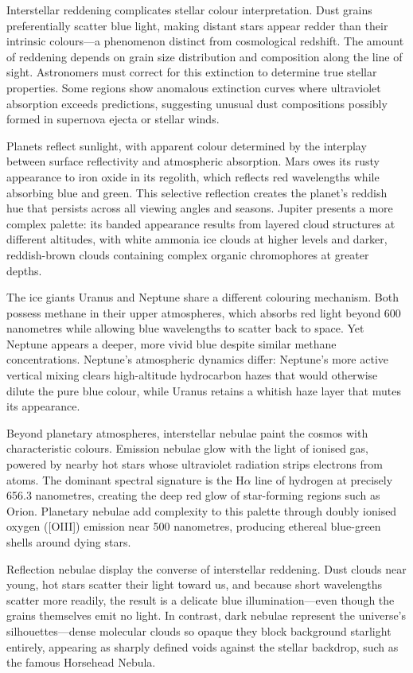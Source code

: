 Interstellar reddening complicates stellar colour interpretation. Dust grains preferentially scatter blue light, making distant stars appear redder than their intrinsic colours—a phenomenon distinct from cosmological redshift. The amount of reddening depends on grain size distribution and composition along the line of sight. Astronomers must correct for this extinction to determine true stellar properties. Some regions show anomalous extinction curves where ultraviolet absorption exceeds predictions, suggesting unusual dust compositions possibly formed in supernova ejecta or stellar winds.

Planets reflect sunlight, with apparent colour determined by the interplay between surface reflectivity and atmospheric absorption. Mars owes its rusty appearance to iron oxide in its regolith, which reflects red wavelengths while absorbing blue and green. This selective reflection creates the planet's reddish hue that persists across all viewing angles and seasons. Jupiter presents a more complex palette: its banded appearance results from layered cloud structures at different altitudes, with white ammonia ice clouds at higher levels and darker, reddish-brown clouds containing complex organic chromophores at greater depths.

The ice giants Uranus and Neptune share a different colouring mechanism. Both possess methane in their upper atmospheres, which absorbs red light beyond 600 nanometres while allowing blue wavelengths to scatter back to space. Yet Neptune appears a deeper, more vivid blue despite similar methane concentrations. Neptune's atmospheric dynamics differ: Neptune's more active vertical mixing clears high-altitude hydrocarbon hazes that would otherwise dilute the pure blue colour, while Uranus retains a whitish haze layer that mutes its appearance.

Beyond planetary atmospheres, interstellar nebulae paint the cosmos with characteristic colours. Emission nebulae glow with the light of ionised gas, powered by nearby hot stars whose ultraviolet radiation strips electrons from atoms. The dominant spectral signature is the H$\alpha$ line of hydrogen at precisely 656.3 nanometres, creating the deep red glow of star-forming regions such as Orion. Planetary nebulae add complexity to this palette through doubly ionised oxygen ([OIII]) emission near 500 nanometres, producing ethereal blue-green shells around dying stars.

Reflection nebulae display the converse of interstellar reddening. Dust clouds near young, hot stars scatter their light toward us, and because short wavelengths scatter more readily, the result is a delicate blue illumination—even though the grains themselves emit no light. In contrast, dark nebulae represent the universe's silhouettes—dense molecular clouds so opaque they block background starlight entirely, appearing as sharply defined voids against the stellar backdrop, such as the famous Horsehead Nebula.

